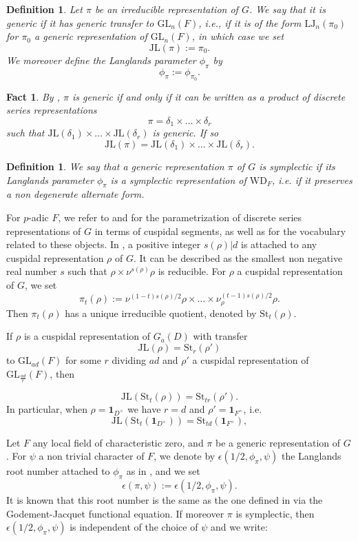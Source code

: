 \documentclass[11pt,letterpaper]{amsart}
\newcommand{\GL}{{\mathrm {GL}}} \newcommand{\PGL}{{\mathrm {PGL}}}
\newcommand{\triv}{{\mathbf{1}}}
\newcommand{\JL}{{\mathrm{JL}}}
\def\d{\delta}
\def\St{\mathrm{St}}
\theoremstyle{plain}
\newtheorem{df}[thm]{Definition}
\newtheorem{fct}[thm]{Fact}
\numberwithin{equation}{section}
\begin{document}
\begin{df}
Let $\pi$ be an irreducible representation of $G$. We say that it is generic if it has generic transfer to $\GL_n(F)$, i.e., if it is of the form 
$\mathrm{LJ}_n(\pi_0)$ for $\pi_0$ a generic representation of $\GL_n(F)$, in which case we set \[\JL(\pi):=\pi_0.\] 
We moreover define the Langlands parameter $\phi_\pi$ by 
\[\phi_\pi:=\phi_{\pi_0}.\]
\end{df}

\begin{fct}
By \cite[Proposition 3.4]{Bjlu}, $\pi$ is generic if and only if it can be written as a product of discrete series representations 
\[\pi=\d_1\times \dots \times \d_r\] such that $\JL(\d_1)\times \dots \times \JL(\d_r)$ is generic. If so 
\[\JL(\pi)=\JL(\d_1)\times \dots \times \JL(\d_r).\]
\end{fct}

\begin{df}
We say that a generic representation $\pi$ of $G$ is symplectic if its Langlands parameter $\phi_{\pi}$ is a symplectic representation of 
$\mathrm{WD}_F$, i.e. if it preserves a non degenerate alternate form.
\end{df}

For $p$-adic $F$, we refer to \cite{Z} and \cite{Tglna} for the parametrization of discrete series representations of $G$ in terms of cuspidal segments, as well as for the vocabulary related to these objects. In \cite{Tglna}, a positive integer $s(\rho)|d$ is attached to any cuspidal representation $\rho$ of $G$. It can be described as the smallest non negative real number $s$ such that $\rho\times \nu^{s(\rho)}\rho$ is reducible. For $\rho$ a cuspidal representation of $G$, we set \[\pi_t(\rho):=\nu^{(1-t)s(\rho)/{2}}\rho\times \dots \times \nu_{\rho}^{(t-1)s(\rho)/{2}}\rho.\]
Then $\pi_t(\rho)$ has a unique irreducible quotient, denoted by $\St_t(\rho)$.

If $\rho$ is a cuspidal representation of $G_a(D)$ with transfer \[\JL(\rho)=\St_r(\rho')\] to $\GL_{ad}(F)$ for some $r$ dividing $ad$ and $\rho'$ a cuspidal representation of $\GL_{\frac{ad}{r}}(F)$, then 

\[\JL(\St_t(\rho))=\St_{tr}(\rho').\] In particular, when $\rho=\triv_{D^\times}$ we have $r=d$ and $\rho'=\triv_{F^\times}$, i.e. 
\[\JL(\St_t(\triv_{D^\times}))=\St_{td}(\triv_{F^\times}),\]

Let $F$ any local field of characteristic zero, and $\pi$ be a generic representation of $G$. For $\psi$ a non trivial character of $F$, we denote by $\epsilon(1/2,\phi_\pi,\psi)$ the Langlands root number attached to $\phi_{\pi}$ as in \cite{Tate}, and we set 
\[\epsilon(\pi,\psi):=\epsilon(1/2,\phi_\pi,\psi).\] It is known that this root number is the same as the one defined in \cite{GJ} via the Godement-Jacquet functional equation. If moreover $\pi$ is symplectic, then $\epsilon(1/2,\phi_\pi,\psi)$ is independent of the choice of $\psi$ and we write:
\end{document}
